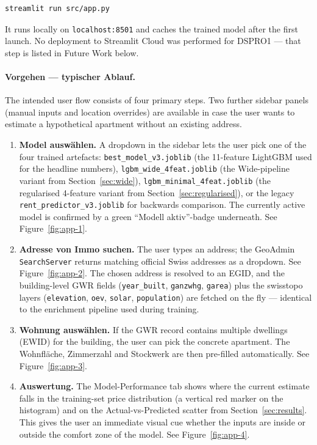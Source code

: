 \documentclass[11pt,a4paper]{article}
\begin{document}
\begin{verbatim}
streamlit run src/app.py
\end{verbatim}

It runs locally on \texttt{localhost:8501} and caches the trained model after the first launch. No deployment to Streamlit Cloud was performed for DSPRO1 — that step is listed in Future Work below.

\paragraph{Vorgehen — typischer Ablauf.}
The intended user flow consists of four primary steps. Two further sidebar panels (manual inputs and location overrides) are available in case the user wants to estimate a hypothetical apartment without an existing address.

\begin{enumerate}
    \item \textbf{Model auswählen.} A dropdown in the sidebar lets the user pick one of the four trained artefacts: \texttt{best\_model\_v3.joblib} (the 11-feature LightGBM used for the headline numbers), \texttt{lgbm\_wide\_4feat.joblib} (the Wide-pipeline variant from Section~\ref{sec:wide}), \texttt{lgbm\_minimal\_4feat.joblib} (the regularised 4-feature variant from Section~\ref{sec:regularised}), or the legacy \texttt{rent\_predictor\_v3.joblib} for backwards comparison. The currently active model is confirmed by a green ``Modell aktiv''-badge underneath. See Figure~\ref{fig:app-1}.
    \item \textbf{Adresse von Immo suchen.} The user types an address; the GeoAdmin \texttt{SearchServer} returns matching official Swiss addresses as a dropdown. See Figure~\ref{fig:app-2}. The chosen address is resolved to an EGID, and the building-level GWR fields (\texttt{year\_built}, \texttt{ganzwhg}, \texttt{garea}) plus the swisstopo layers (\texttt{elevation}, \texttt{oev}, \texttt{solar}, \texttt{population}) are fetched on the fly — identical to the enrichment pipeline used during training.
    \item \textbf{Wohnung auswählen.} If the GWR record contains multiple dwellings (EWID) for the building, the user can pick the concrete apartment. The Wohnfläche, Zimmerzahl and Stockwerk are then pre-filled automatically. See Figure~\ref{fig:app-3}.
    \item \textbf{Auswertung.} The Model-Performance tab shows where the current estimate falls in the training-set price distribution (a vertical red marker on the histogram) and on the Actual-vs-Predicted scatter from Section~\ref{sec:results}. This gives the user an immediate visual cue whether the inputs are inside or outside the comfort zone of the model. See Figure~\ref{fig:app-4}.
\end{enumerate}
\end{document}
